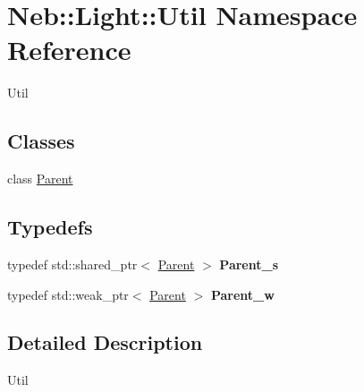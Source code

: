 \hypertarget{namespaceNeb_1_1Light_1_1Util}{\section{\-Neb\-:\-:\-Light\-:\-:\-Util \-Namespace \-Reference}
\label{namespaceNeb_1_1Light_1_1Util}
}


\-Util  


\subsection*{\-Classes}
\begin{DoxyCompactItemize}
\item 
class \hyperlink{classNeb_1_1Light_1_1Util_1_1Parent}{\-Parent}
\end{DoxyCompactItemize}
\subsection*{\-Typedefs}
\begin{DoxyCompactItemize}
\item 
\hypertarget{namespaceNeb_1_1Light_1_1Util_a85920a3e5b51d7914c132774cf0af5d3}{typedef std\-::shared\-\_\-ptr$<$ \hyperlink{classNeb_1_1Light_1_1Util_1_1Parent}{\-Parent} $>$ {\bfseries \-Parent\-\_\-s}}\label{namespaceNeb_1_1Light_1_1Util_a85920a3e5b51d7914c132774cf0af5d3}

\item 
\hypertarget{namespaceNeb_1_1Light_1_1Util_af86fc1f65586912c856bd58efacf1e0f}{typedef std\-::weak\-\_\-ptr$<$ \hyperlink{classNeb_1_1Light_1_1Util_1_1Parent}{\-Parent} $>$ {\bfseries \-Parent\-\_\-w}}\label{namespaceNeb_1_1Light_1_1Util_af86fc1f65586912c856bd58efacf1e0f}

\end{DoxyCompactItemize}


\subsection{\-Detailed \-Description}
\-Util 